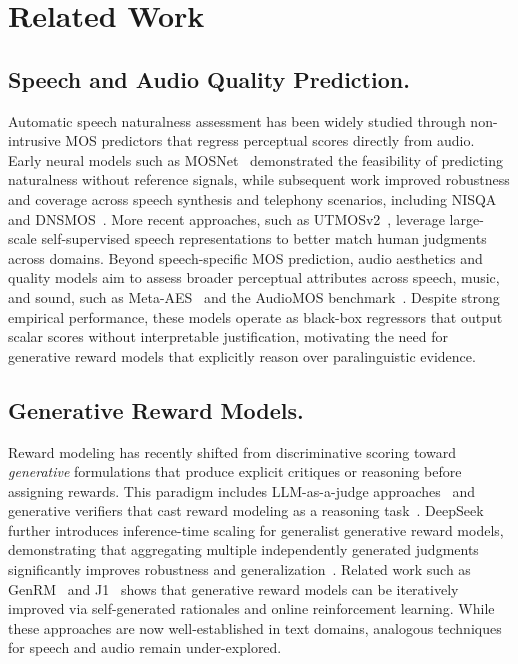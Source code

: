 \section{Related Work} \label{sec:related}

\subsection{Speech and Audio Quality Prediction.}
Automatic speech naturalness assessment has been widely studied through non-intrusive MOS predictors that regress perceptual scores directly from audio. Early neural models such as MOSNet~\cite{lo2019mosnet} demonstrated the feasibility of predicting naturalness without reference signals, while subsequent work improved robustness and coverage across speech synthesis and telephony scenarios, including NISQA~\cite{mittag2021nisqa} and DNSMOS~\cite{reddy2021dnsmos}. More recent approaches, such as UTMOSv2~\cite{baba2024utmosv2}, leverage large-scale self-supervised speech representations to better match human judgments across domains. Beyond speech-specific MOS prediction, audio aesthetics and quality models aim to assess broader perceptual attributes across speech, music, and sound, such as Meta-AES~\cite{tjandra2025meta} and the AudioMOS benchmark~\cite{huang2025audiomos}. Despite strong empirical performance, these models operate as black-box regressors that output scalar scores without interpretable justification, motivating the need for generative reward models that explicitly reason over paralinguistic evidence.

\subsection{Generative Reward Models.}
Reward modeling has recently shifted from discriminative scoring toward \emph{generative} formulations that produce explicit critiques or reasoning before assigning rewards. This paradigm includes LLM-as-a-judge approaches~\cite{li2025generation,li2024llms} and generative verifiers that cast reward modeling as a reasoning task~\cite{zhang2024generativeverifiers}. DeepSeek further introduces inference-time scaling for generalist generative reward models, demonstrating that aggregating multiple independently generated judgments significantly improves robustness and generalization~\cite{liu2025inference}. Related work such as GenRM~\cite{mahan2024generative} and J1~\cite{whitehouse2025j1} shows that generative reward models can be iteratively improved via self-generated rationales and online reinforcement learning. While these approaches are now well-established in text domains, analogous techniques for speech and audio remain under-explored.

